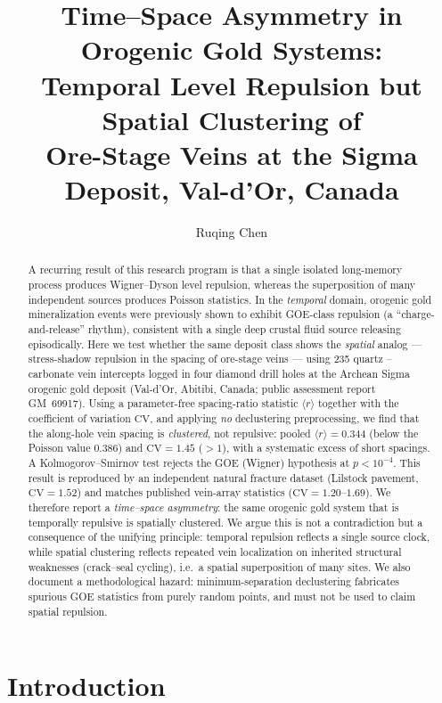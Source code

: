 \documentclass[11pt]{article}
\title{\bfseries Time--Space Asymmetry in Orogenic Gold Systems:\\
Temporal Level Repulsion but Spatial Clustering of\\
Ore-Stage Veins at the Sigma Deposit, Val-d'Or, Canada}
\author[1]{Ruqing Chen}
\affil[1]{GUT Geoservice Inc., Montreal, Quebec, Canada \\ \texttt{ruqing@hotmail.com}}
\date{}
\begin{document}
\maketitle

\begin{abstract}
\noindent
A recurring result of this research program is that a single isolated
long-memory process produces Wigner--Dyson level repulsion, whereas the
superposition of many independent sources produces Poisson statistics. In the
\emph{temporal} domain, orogenic gold mineralization events were previously
shown to exhibit GOE-class repulsion (a ``charge-and-release'' rhythm),
consistent with a single deep crustal fluid source releasing episodically. Here
we test whether the same deposit class shows the \emph{spatial} analog ---
stress-shadow repulsion in the spacing of ore-stage veins --- using 235 quartz%
--carbonate vein intercepts logged in four diamond drill holes at the
Archean Sigma orogenic gold deposit (Val-d'Or, Abitibi, Canada; public
assessment report GM~69917). Using a parameter-free spacing-ratio statistic
$\langle r\rangle$ together with the coefficient of variation $\mathrm{CV}$,
and applying \emph{no} declustering preprocessing, we find that the along-hole
vein spacing is \emph{clustered}, not repulsive: pooled $\langle r\rangle=0.344$
(below the Poisson value $0.386$) and $\mathrm{CV}=1.45$ ($>1$), with a
systematic excess of short spacings. A Kolmogorov--Smirnov test rejects the GOE
(Wigner) hypothesis at $p<10^{-4}$. This result is reproduced by an independent
natural fracture dataset (Lilstock pavement, $\mathrm{CV}=1.52$) and matches
published vein-array statistics ($\mathrm{CV}=1.20$--$1.69$). We therefore
report a \emph{time--space asymmetry}: the same orogenic gold system that is
temporally repulsive is spatially clustered. We argue this is not a
contradiction but a consequence of the unifying principle: temporal repulsion
reflects a single source clock, while spatial clustering reflects repeated vein
localization on inherited structural weaknesses (crack--seal cycling), i.e.\ a
spatial superposition of many sites. We also document a methodological hazard:
minimum-separation declustering fabricates spurious GOE statistics from purely
random points, and must not be used to claim spatial repulsion.
\end{abstract}

\section{Introduction}
\end{document}
